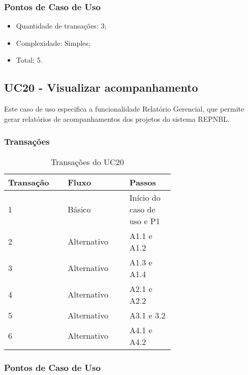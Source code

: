   \subsubsection{Pontos de Caso de Uso}

  \begin{itemize}
  \item Quantidade de transações: 3;
  \item Complexidade: Simples;
  \item Total: 5.
  \end{itemize}
   
  \vfill
  
  
  
  
\pagebreak
\subsection{UC20 - Visualizar acompanhamento}
  
  Este caso de uso especifica a funcionalidade Relatório Gerencial, que permite gerar 
  relatórios de acompanhamentos dos projetos do sistema REPNBL.
  
  \subsubsection{Transações}

  \begin{table*}[!h]
  \centering
  \caption{Transações do UC20}
  \label{uc20_transactions}
    \begin{tabular}{|p{0.20\linewidth}|p{0.25\linewidth}|p{0.20\linewidth}|}
    \hline
    \textbf{Transação} & \textbf{Fluxo} & \textbf{Passos} \\ 
    \hline
    1 & Básico & Início do caso de uso e P1\\
    \hline
    2 & Alternativo & A1.1 e A1.2 \\
    \hline
    3 & Alternativo & A1.3 e A1.4 \\
    \hline
    4 & Alternativo & A2.1 e A2.2\\
    \hline
    5 & Alternativo & A3.1 e 3.2\\
    \hline
    6 & Alternativo & A4.1 e A4.2\\
    \hline
    \end{tabular}
  \end{table*}

  \subsubsection{Pontos de Caso de Uso}

